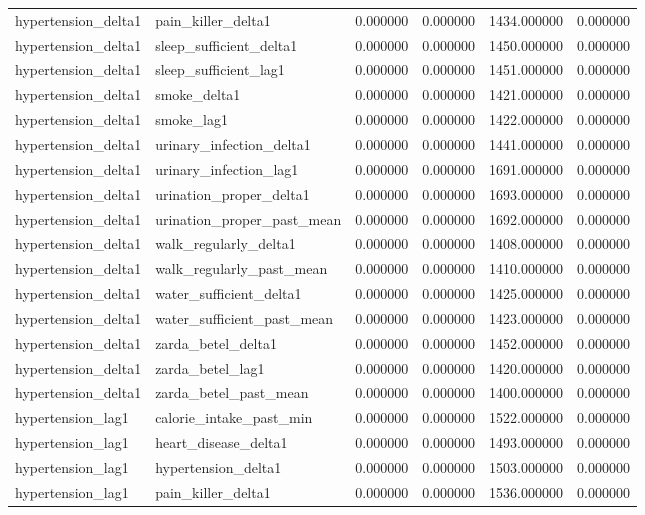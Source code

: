 \begin{longtable}{llrrrr}
hypertension\_delta1 & pain\_killer\_delta1 & 0.000000 & 0.000000 & 1434.000000 & 0.000000 \\
hypertension\_delta1 & sleep\_sufficient\_delta1 & 0.000000 & 0.000000 & 1450.000000 & 0.000000 \\
hypertension\_delta1 & sleep\_sufficient\_lag1 & 0.000000 & 0.000000 & 1451.000000 & 0.000000 \\
hypertension\_delta1 & smoke\_delta1 & 0.000000 & 0.000000 & 1421.000000 & 0.000000 \\
hypertension\_delta1 & smoke\_lag1 & 0.000000 & 0.000000 & 1422.000000 & 0.000000 \\
hypertension\_delta1 & urinary\_infection\_delta1 & 0.000000 & 0.000000 & 1441.000000 & 0.000000 \\
hypertension\_delta1 & urinary\_infection\_lag1 & 0.000000 & 0.000000 & 1691.000000 & 0.000000 \\
hypertension\_delta1 & urination\_proper\_delta1 & 0.000000 & 0.000000 & 1693.000000 & 0.000000 \\
hypertension\_delta1 & urination\_proper\_past\_mean & 0.000000 & 0.000000 & 1692.000000 & 0.000000 \\
hypertension\_delta1 & walk\_regularly\_delta1 & 0.000000 & 0.000000 & 1408.000000 & 0.000000 \\
hypertension\_delta1 & walk\_regularly\_past\_mean & 0.000000 & 0.000000 & 1410.000000 & 0.000000 \\
hypertension\_delta1 & water\_sufficient\_delta1 & 0.000000 & 0.000000 & 1425.000000 & 0.000000 \\
hypertension\_delta1 & water\_sufficient\_past\_mean & 0.000000 & 0.000000 & 1423.000000 & 0.000000 \\
hypertension\_delta1 & zarda\_betel\_delta1 & 0.000000 & 0.000000 & 1452.000000 & 0.000000 \\
hypertension\_delta1 & zarda\_betel\_lag1 & 0.000000 & 0.000000 & 1420.000000 & 0.000000 \\
hypertension\_delta1 & zarda\_betel\_past\_mean & 0.000000 & 0.000000 & 1400.000000 & 0.000000 \\
hypertension\_lag1 & calorie\_intake\_past\_min & 0.000000 & 0.000000 & 1522.000000 & 0.000000 \\
hypertension\_lag1 & heart\_disease\_delta1 & 0.000000 & 0.000000 & 1493.000000 & 0.000000 \\
hypertension\_lag1 & hypertension\_delta1 & 0.000000 & 0.000000 & 1503.000000 & 0.000000 \\
hypertension\_lag1 & pain\_killer\_delta1 & 0.000000 & 0.000000 & 1536.000000 & 0.000000 \\

\end{longtable}
